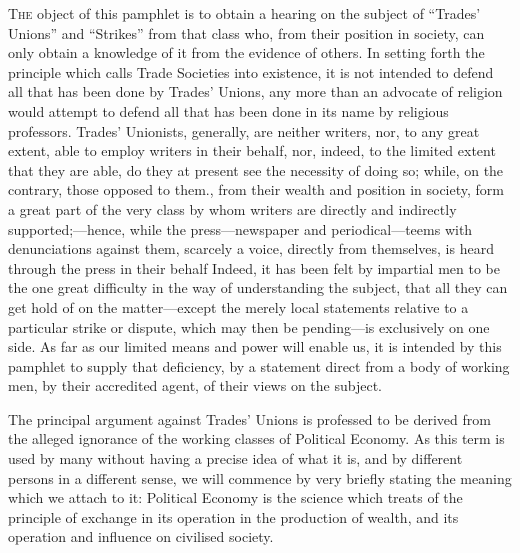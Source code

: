 \documentclass[12pt, a4paper]{book}
\begin{document}
    {\noindent \textsc{The} object of this pamphlet is to obtain a
    hearing on the subject of ``Trades' Unions'' and ``Strikes'' from
    that class who, from their position in society, can only obtain a
    knowledge of it from the evidence of others. In setting forth the
    principle which calls Trade Societies into existence, it is not
    intended to defend all that has been done by Trades' Unions, any
    more than an advocate of religion would attempt to defend all that
    has been done in its name by religious professors. Trades'
    Unionists, generally, are neither writers, nor, to any great extent,
    able to employ writers in their behalf, nor, indeed, to the limited
    extent that they are able, do they at present see the necessity of
    doing so; while, on the contrary, those opposed to them., from their
    wealth and position in society, form a great part of the very class
    by whom writers are directly and indirectly supported;---hence,
    while the press---newspaper and periodical---teems with
    denunciations against them, scarcely a voice, directly from
    themselves, is heard through the press in their behalf Indeed, it
    has been felt by impartial men to be the one great difficulty in the
    way of understanding the subject, that all they can get hold of on
    the matter---except the merely local statements relative to a
    particular strike or dispute, which may then be pending---is
    exclusively on one side. As far as our limited means and power will
    enable us, it is intended by this pamphlet to supply that
    deficiency, by a statement direct from a body of working men, by
    their accredited agent, of their views on the subject.}

    The principal argument against Trades' Unions is professed to be
    derived from the alleged ignorance of the working classes of
    Political Economy. As this term is used by many without having a
    precise idea of what it is, and by different persons in a different
    sense, we will commence by very briefly stating the meaning which we
    attach to it: Political Economy is the science which treats of the
    principle of exchange in its operation in the production of wealth,
    and its operation and influence on civilised society.
\end{document}

